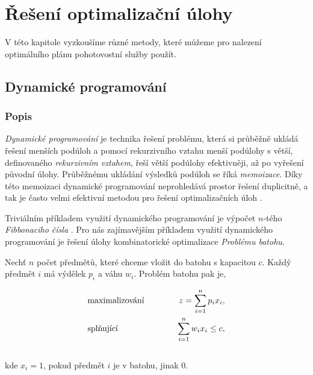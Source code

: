 \theoremstyle{definition}
\newtheorem{exmp}{Příklad}[section]

\chapter{Řešení optimalizační úlohy}\label{chap:reseniOptUloh}

V této kapitole vyzkoušíme různé metody, které můžeme pro nalezení optimálního plánu pohotovostní služby použít.

\section{Dynamické programování}\label{kap:dynamicProgram}

\subsection{Popis}

\textit{Dynamické programování} je technika řešení problému, která si průběžně ukládá řešení menších podúloh a pomocí rekurzivního vztahu menší podúlohy s větší,
definovaného \textit{rekurzivním vztahem}, řeší větší podúlohy efektivněji, až po vyřešení původní úlohy. 
Průběžnému ukládání výsledků podúloh se říká \textit{memoizace}.
Díky této memoizaci dynamické programování neprohledává prostor řešení duplicitně, a tak je často velmi efektivní metodou pro řešení optimalizačních úloh \cite{dynamic}.

Triviálním příkladem využití dynamického programování je výpočet $n$-tého \textit{Fibbonaciho čísla} \cite{mares}.
Pro nás zajímavějším příkladem využití dynamického programování je řešení úlohy kombinatorické optimalizace \textit{Problému batohu}.

\begin{definice}
  Nechť $n$ počet předmětů, které chceme vložit do batohu s kapacitou $c$.
  Každý předmět $i$ má výdělek $p_i$ a váhu $w_i$. Problém batohu pak je,

  \begin{alignat*}{2}
    &\normalfont \text{maximalizování} \hspace{30pt} &z = \sum_{i=1}^n p_i x_i, \\
    &\normalfont \text{splňující}   \hspace{30pt} &\sum_{i = 1}^{n} w_i x_i \leq c,
  \end{alignat*}
  \\
  kde $x_i = 1$, pokud předmět $i$ je v batohu, jinak $0$.
  \\
\end{definice}

